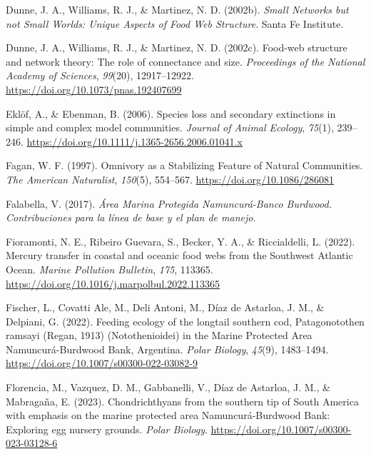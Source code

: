 \documentclass[preprint, 3p,
authoryear]{elsarticle} %
\newlength{\cslhangindent}
\newlength{\cslentryspacingunit} %
\newenvironment{CSLReferences}[2] %
 {%
  \setlength{\parindent}{0pt}
  \ifodd #1
  \let\oldpar\par
  \def\par{\hangindent=\cslhangindent\oldpar}
  \fi
  \setlength{\parskip}{#2\cslentryspacingunit}
 }%
 {}
\begin{document}
\begin{CSLReferences}{1}{0}
\leavevmode{}%
Dunne, J. A., Williams, R. J., \& Martinez, N. D. (2002b). \emph{Small
{Networks} but not {Small Worlds}: {Unique Aspects} of {Food Web
Structure}}. {Santa Fe Institute}.

\leavevmode{}%
Dunne, J. A., Williams, R. J., \& Martinez, N. D. (2002c). Food-web
structure and network theory: {The} role of connectance and size.
\emph{Proceedings of the National Academy of Sciences}, \emph{99}(20),
12917--12922. \url{https://doi.org/10.1073/pnas.192407699}

\leavevmode{}%
Eklöf, A., \& Ebenman, B. (2006). Species loss and secondary extinctions
in simple and complex model communities. \emph{Journal of Animal
Ecology}, \emph{75}(1), 239--246.
\url{https://doi.org/10.1111/j.1365-2656.2006.01041.x}

\leavevmode{}%
Fagan, W. F. (1997). Omnivory as a {Stabilizing Feature} of {Natural
Communities}. \emph{The American Naturalist}, \emph{150}(5), 554--567.
\url{https://doi.org/10.1086/286081}

\leavevmode{}%
Falabella, V. (2017). \emph{Área {Marina Protegida Namuncurá-Banco
Burdwood}. {Contribuciones} para la línea de base y el plan de manejo}.

\leavevmode{}%
Fioramonti, N. E., Ribeiro Guevara, S., Becker, Y. A., \& Riccialdelli,
L. (2022). Mercury transfer in coastal and oceanic food webs from the
{Southwest Atlantic Ocean}. \emph{Marine Pollution Bulletin},
\emph{175}, 113365.
\url{https://doi.org/10.1016/j.marpolbul.2022.113365}

\leavevmode{}%
Fischer, L., Covatti Ale, M., Deli Antoni, M., Díaz de Astarloa, J. M.,
\& Delpiani, G. (2022). Feeding ecology of the longtail southern cod,
{Patagonotothen} ramsayi ({Regan}, 1913) ({Notothenioidei}) in the
{Marine Protected Area Namuncurá-Burdwood Bank}, {Argentina}.
\emph{Polar Biology}, \emph{45}(9), 1483--1494.
\url{https://doi.org/10.1007/s00300-022-03082-9}

\leavevmode{}%
Florencia, M., Vazquez, D. M., Gabbanelli, V., Díaz de Astarloa, J. M.,
\& Mabragaña, E. (2023). Chondrichthyans from the southern tip of {South
America} with emphasis on the marine protected area {Namuncurá-Burdwood
Bank}: Exploring egg nursery grounds. \emph{Polar Biology}.
\url{https://doi.org/10.1007/s00300-023-03128-6}


\end{CSLReferences}
\end{document}

